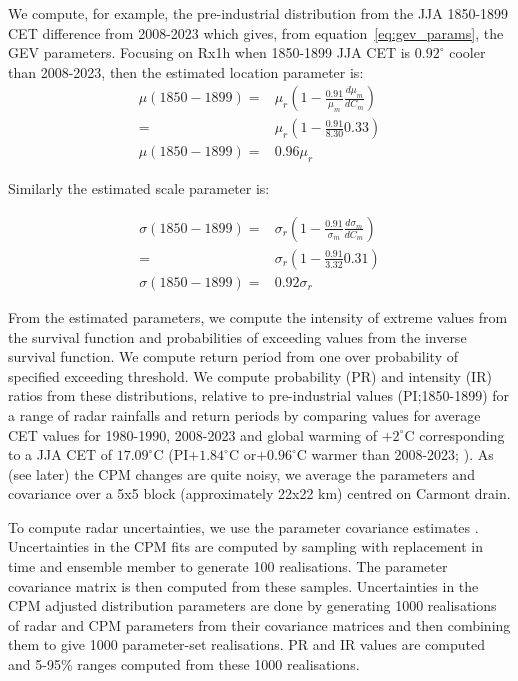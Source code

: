\documentclass[11pt,a4paper]{article}
\begin{document}
We compute, for example, the pre-industrial distribution from  the  JJA 1850-1899 CET difference from 2008-2023  which gives, from equation~\ref{eq:gev_params}, the GEV parameters. Focusing  on Rx1h when 1850-1899 JJA CET is $0.92^\circ$ cooler than 2008-2023, then the estimated location parameter is:
 \begin{align*}
 \mu(1850-1899) =& \mu_r \left( 1 - \frac{0.91}{\mu_m} \frac{d\mu_m}{dC_m}\right) \\
   =&  \mu_r \left( 1 - \frac{0.91}{8.30} 0.33\right)\\
  \mu(1850-1899) = &0.96\mu_r
 	\end{align*}
 
 Similarly the estimated scale parameter is:
 
 \begin{align*}
	\sigma(1850-1899) =& \sigma_r \left( 1 - \frac{0.91}{\sigma_m} \frac{d\sigma_m}{dC_m}\right) \\
	=&  \sigma_r \left( 1 -  \frac{0.91}{3.32} 0.31\right)\\
	\sigma(1850-1899) = &0.92\sigma_r
\end{align*}

 From the estimated parameters, we compute the intensity of  extreme values from the survival function and probabilities of exceeding values  from the  inverse survival function. We compute return period from one over probability of specified exceeding threshold. We compute probability (PR) and intensity (IR) ratios from these distributions, relative to pre-industrial values (PI;1850-1899) for a range of radar rainfalls and return periods by comparing values for average CET values for 1980-1990, 2008-2023 and global warming of $+2^\circ$C corresponding to a JJA CET of $17.09^\circ$C (PI$+1.84^\circ$C or$+0.96^\circ$C warmer than 2008-2023; \cite{tett2023edinburgh}). As (see later) the CPM changes are quite noisy, we average the parameters and covariance over a 5x5 block (approximately 22x22 km) centred on Carmont drain.

To compute radar uncertainties, we use the parameter covariance  estimates \parencite{gilleland2016extremes}. Uncertainties in the CPM fits are computed by sampling with replacement\parencite{Efron1994bootstrap} in time and ensemble member  to generate 100 realisations. The parameter covariance matrix is then computed from these samples. Uncertainties in the CPM adjusted distribution parameters are done by generating 1000 realisations of radar and CPM parameters from their covariance matrices and then  combining them to give 1000 parameter-set realisations. PR and IR values are computed and 5-95\% ranges computed from these 1000 realisations. 
\end{document}
